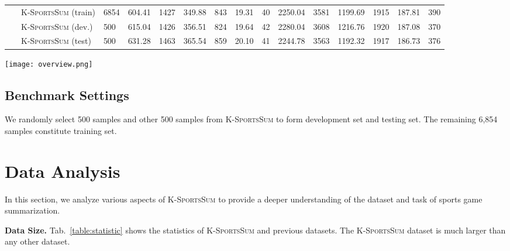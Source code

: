 \begin{table*}[t]
{\begin{tabular}{l|l|cccccc|cccccc}
      \ \ \ \textsc{K-SportsSum} (train)             & 6854                                              & 604.41       & 1427             & 349.88       & 843            & 19.31       & 40              & 2250.04      & 3581            & 1199.69     & 1915           & 187.81      & 390            \\
      \ \ \ \textsc{K-SportsSum} (dev.)                & 500                                               & 615.04      & 1426            & 356.51      & 824            & 19.64       & 42              & 2280.04      & 3608            & 1216.76      & 1920           & 187.08      & 370            \\
      \ \ \ \textsc{K-SportsSum} (test)               & 500                                               & 631.28      & 1463            & 365.54      & 859            & 20.10       & 41              & 2244.78      & 3563            & 1192.32      & 1917           & 186.73      & 376            \\ \hline
      \end{tabular}
  }
  \setlength{\belowcaptionskip}{3pt}
  \caption{Statistics of \textsc{K-SportsSum} and previous datasets (Sent.: sentence, Avg.: average, 95th pctl.: 95th percentile).}
  \label{table:statistic}
\end{table*}

\begin{figure*}[t]
\centerline{\texttt{[image: overview.png]}}
\caption{An overview of knowledge-enhanced summarizer.}
\label{fig:overview}
\end{figure*}

\subsection{Benchmark Settings}
\label{sec:benchmark_settings}
\vspace{0.5ex}
We randomly select 500 samples and other 500 samples from \textsc{K-SportsSum} to form development set and testing set.
The remaining 6,854 samples constitute training set.

\section{Data Analysis}
In this section, we analyze various aspects of \textsc{K-SportsSum} to provide a deeper understanding of the dataset and task of sports game summarization.

\vspace{1ex}
\noindent\textbf{Data Size.} Tab.~\ref{table:statistic} shows the statistics of \textsc{K-SportsSum} and previous datasets. The \textsc{K-SportsSum} dataset is much larger than any other dataset.

